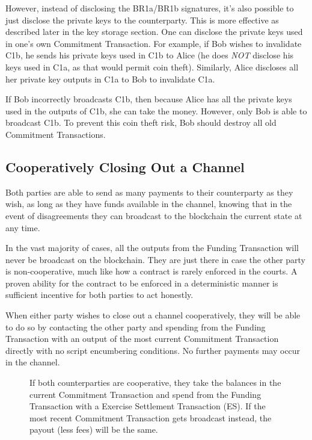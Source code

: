 \documentclass[letterpaper,11pt]{article}
\begin{document}
However, instead of disclosing the BR1a/BR1b signatures, it's also possible to
just disclose the private keys to the counterparty. This is more effective as
described later in the key storage section. One can disclose the private keys
used in one's own Commitment Transaction. For example, if Bob wishes to
invalidate C1b, he sends his private keys used in C1b to Alice (he does
\textit{NOT} disclose his keys used in C1a, as that would permit coin theft).
Similarly, Alice discloses all her private key outputs in C1a to Bob to
invalidate C1a.

If Bob incorrectly broadcasts C1b, then because Alice has all the private keys
used in the outputs of C1b, she can take the money. However, only Bob is able
to broadcast C1b. To prevent this coin theft risk, Bob should destroy all old
Commitment Transactions.

\subsection{Cooperatively Closing Out a Channel}

Both parties are able to send as many payments to their counterparty as they
wish, as long as they have funds available in the channel, knowing that in the
event of disagreements they can broadcast to the blockchain the current state
at any time.

In the vast majority of cases, all the outputs from the Funding Transaction
will never be broadcast on the blockchain. They are just there in case the
other party is non-cooperative, much like how a contract is rarely enforced in
the courts. A proven ability for the contract to be enforced in a deterministic
manner is sufficient incentive for both parties to act honestly.

When either party wishes to close out a channel cooperatively, they will be
able to do so by contacting the other party and spending from the Funding
Transaction with an output of the most current Commitment Transaction directly
with no script encumbering conditions. No further payments may occur in the
channel.

\begin{figure}[H]
	\caption{If both counterparties are cooperative, they take the
		balances in the current Commitment Transaction and spend from
		the Funding Transaction with a Exercise Settlement Transaction
		(ES). If the most recent Commitment Transaction gets broadcast
		instead, the payout (less fees) will be the same.
	}
\end{figure}
\end{document}
